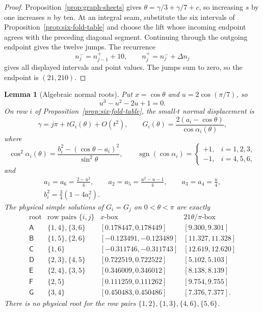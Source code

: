 \documentclass[11pt,reqno]{amsart}
\theoremstyle{plain}
\newtheorem{lemma}[theorem]{Lemma}
\theoremstyle{definition}
\begin{document}
\begin{proof}
Proposition~\ref{prop:graph-sheets} gives
$\theta=\gamma/3+\gamma/7+c$, so increasing $s$ by one increases $n$ by ten.  At an integral
seam, substitute the six intervals of Proposition~\ref{prop:six-fold-table} and choose the lift
whose incoming endpoint agrees with the preceding diagonal segment.  Continuing through the
outgoing endpoint gives the twelve jumps.  The recurrence
\[
 n_j^-=n_{j-1}^++10,
 \qquad
 n_j^+=n_j^-+\Delta n_j
\]
gives all displayed intervals and point values.  The jumps sum to zero, so the endpoint is
$(21,210)$.
\end{proof}

\begin{lemma}[Algebraic normal roots]\label{lem:normal-roots}
Put $x=\cos\theta$ and $u=2\cos(\pi/7)$, so
\[
 u^3-u^2-2u+1=0.
\]
On row $i$ of Proposition~\ref{prop:six-fold-table}, the small-$t$ normal displacement is
\begin{equation}\label{eq:normal-displacement}
 \gamma=j\pi+tG_i(\theta)+O(t^2),
 \qquad
 G_i(\theta)=\frac{2(a_i-\cos\theta)}{\cos\alpha_i(\theta)},
\end{equation}
where
\begin{equation}\label{eq:alpha-square}
 \cos^2\alpha_i(\theta)
 =\frac{b_i^2-(\cos\theta-a_i)^2}{\sin^2\theta},
 \qquad
 \operatorname{sgn}(\cos\alpha_i)=
 \begin{cases}+1,&i=1,2,3,\\-1,&i=4,5,6,
 \end{cases}
\end{equation}
and
\[
\begin{gathered}
 a_1=a_6=\frac{2-u^2}{4},
 \qquad
 a_2=a_5=\frac{u^2-u-1}{4},
 \qquad
 a_3=a_4=\frac u4,\\
 b_i^2=\frac34(1-4a_i^2).
\end{gathered}
\]
The physical simple solutions of $G_i=G_j$ on $0<\theta<\pi$ are exactly
\[
\begin{array}{c|c|c|c}
\text{root}&\text{row pairs }\{i,j\}&x\text{-box}
 &21\theta/\pi\text{-box}\\ \hline
\mathsf A&\{1,4\},\{3,6\}&[0.178447,0.178449]&[9.300,9.301]\\
\mathsf B&\{1,5\},\{2,6\}&[-0.123491,-0.123489]&[11.327,11.328]\\
\mathsf C&\{1,6\}&[-0.311746,-0.311743]&[12.619,12.620]\\
\mathsf D&\{2,3\},\{4,5\}&[0.722519,0.722522]&[5.102,5.103]\\
\mathsf E&\{2,4\},\{3,5\}&[0.346009,0.346012]&[8.138,8.139]\\
\mathsf F&\{2,5\}&[0.111259,0.111262]&[9.754,9.755]\\
\mathsf G&\{3,4\}&[0.450483,0.450486]&[7.376,7.377].
\end{array}
\]
There is no physical root for the row pairs
$\{1,2\},\{1,3\},\{4,6\},\{5,6\}$.
\end{lemma}
\end{document}
